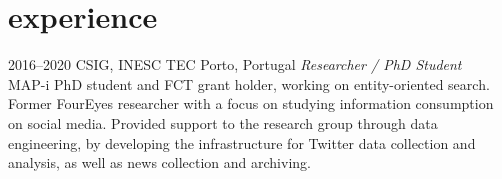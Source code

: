 \documentclass{friggeri-cv}
\begin{document}

\section{experience}

\begin{entrylist}
\entry
{2016--2020}
{CSIG, INESC TEC}
{Porto, Portugal}
{\emph{Researcher / PhD Student}\\
MAP-i PhD student and FCT grant holder, working on entity-oriented search. Former FourEyes researcher with a focus on studying information consumption on social media. Provided support to the research group through data engineering, by developing the infrastructure for Twitter data collection and analysis, as well as news collection and archiving.}
\end{entrylist}
\end{document}
